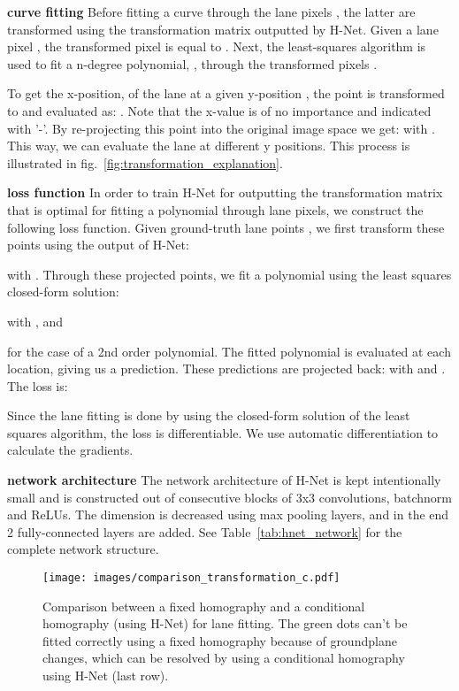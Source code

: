 \documentclass[letterpaper, 10 pt, conference]{ieeeconf}
\begin{document}
\textbf{curve fitting} Before fitting a curve through the lane pixels , the latter are transformed using the transformation matrix outputted by H-Net. Given a lane pixel , the transformed pixel  is equal to . Next, the least-squares algorithm is used to fit a n-degree polynomial, , through the transformed pixels . 

To get the x-position,  of the lane at a given y-position , the point  is transformed to  and evaluated as: . Note that the x-value is of no importance and indicated with '-'. By re-projecting this point  into the original image space we get:   with .
This way, we can evaluate the lane at different y positions. This process is illustrated in fig.~\ref{fig:transformation_explanation}.

\textbf{loss function} In order to train H-Net for outputting the transformation matrix that is optimal for fitting a polynomial through lane pixels, we construct the following loss function. Given  ground-truth lane points , we first transform these points using the output of H-Net:

with .
Through these projected points, we fit a polynomial  using the least squares closed-form solution:

with  ,  and 

for the case of a 2nd order polynomial. The fitted polynomial is evaluated at each  location, giving us a  prediction. 
These predictions are projected back:  with  and .
The loss is: 



Since the lane fitting is done by using the closed-form solution of the least squares algorithm, the loss is differentiable. We use automatic differentiation to calculate the gradients. 

\textbf{network architecture} The network architecture of H-Net is kept intentionally small and is constructed out of consecutive blocks of 3x3 convolutions, batchnorm and ReLUs. The dimension is decreased using max pooling layers, and in the end 2 fully-connected layers are added. See Table~\ref{tab:hnet_network} for the complete network structure. 


\begin{figure}
	\begin{center}
		\texttt{[image: images/comparison\_transformation\_c.pdf]}
	\end{center}
	\caption{Comparison between a fixed homography and a conditional homography (using H-Net) for lane fitting. The green dots can't be fitted correctly using a fixed homography because of groundplane changes, which can be resolved by using a conditional homography using H-Net (last row).}
	\label{fig:comp_transf}
\end{figure}
\end{document}
